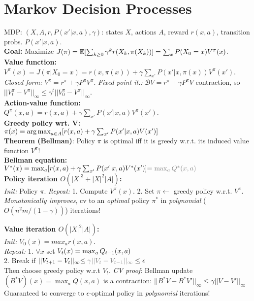 \section{Markov Decision Processes}
MDP: $(X, A, r, P(x'|x, a), \gamma)$: states $X$, actions $A$, reward $r(x,a)$, transition probs.
    $P(x'|x,a)$.\\ 
\textbf{Goal:} Maximize $J(\pi) = \mathbb{E}[\sum_{k\geq0} \gamma^k r(X_k, \pi(X_k))] = \sum_{x}P(X_0=x)V^\pi(x)$.\\
\textbf{Value function:} $V^\pi(x) = J(\pi|X_0=x) = r(x,\pi(x)) + \gamma\sum_{x'} P(x'|x,\pi(x))V^\pi(x')$.\\
\emph{Closed form:} $V^{\pi} = r^\pi + \gamma P^\pi V^{\pi}$. \emph{Fixed-point it.:} $\mathcal{B}V = r^\pi+\gamma P^\pi V$ contraction, so $||V_t^\pi-V^\pi||_\infty \leq \gamma^t||V_0^\pi-V^\pi||_\infty$.\\
\textbf{Action-value function:}\\$Q^\pi(x,a)=r(x,a)+\gamma\sum_{x'}P(x'|x,a)V^\pi(x')$.\\
\textbf{Greedy policy wrt. V:}\\
$\pi(x)=\operatorname*{arg\,max}_{a\in A} [r(x,a)+\gamma \sum_{x'}P(x'|x,a)V(x')]$\\
\textbf{Theorem (Bellman)}: Policy $\pi$ is optimal iff it is greedy w.r.t. its induced value function $V^\pi$!\\
\textbf{Bellman equation:} $V^*(x)=\max_a[r(x,a)+\gamma \sum_{x'}P(x'|x,a)V^*(x')] {\color{gray}=\max_a Q^*(x,a)}$\\
\textbf{Policy iteration $O(|X|^3+|X|^2|A|)$:}\\
\emph{Init:} Policy $\pi$. \emph{Repeat:} 1. Compute $V^\pi (x)$. 2. Set $\pi \leftarrow$ greedy policy w.r.t. $V^\pi$.\\
\emph{Monotonically improves}, cv to an \emph{optimal} policy $\pi^*$ in \emph{polynomial} ($O(n^2m/(1-\gamma))$) iterations!

\textbf{Value iteration $O(|X|^2|A|)$:}\\
\emph{Init:} $V_0(x)=max_a r(x,a)$.\\
\emph{Repeat:}
1. $\forall x$ set $V_t(x)=\max_aQ_{t{\color{gray}-1}}(x,a)$\\
2. Break if $||V_{t+1}-V_{t}||_{\infty}{\leq\color{gray}\gamma||V_t-V_{t-1}||_{\infty}}\leq\epsilon$\\
Then choose greedy policy w.r.t $V_t$.
\emph{CV proof}: Bellman update $(B^*V)(x) = \max_a Q(x,a)$ is a contraction: $||B^*V-B^*V'||_\infty \leq \gamma||V-V'||_\infty$\\
Guaranteed to converge to $\epsilon$-optimal policy in \emph{polynomial} iterations!

